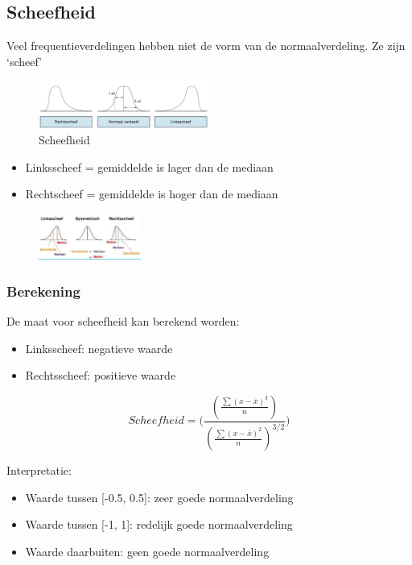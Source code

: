 \documentclass{article}
\begin{document}
\subsection{Scheefheid}

Veel frequentieverdelingen hebben niet de vorm van de normaalverdeling. Ze zijn `scheef'

\begin{figure}[H]
    \centering
    \includegraphics[width=0.5\textwidth]{scheefheid.png}
    \caption{Scheefheid}
\end{figure}

\begin{itemize}
    \item Linksscheef = gemiddelde is lager dan de mediaan
    \item Rechtscheef = gemiddelde is hoger dan de mediaan
\end{itemize}

\begin{figure}[H]
    \centering
    \includegraphics[width=0.3\textwidth]{scheefheid2.png}
\end{figure}

\subsubsection{Berekening}

De maat voor scheefheid kan berekend worden:

\begin{itemize}
    \item Linksscheef: negatieve waarde
    \item Rechtsscheef: positieve waarde
\end{itemize}

\begin{equation}
    Scheefheid = \Bigg(\frac{(\frac{\sum(x - \bar{x})^3}{n})}{(\frac{\sum(x - \bar{x})^2}{n})^{3/2}}\Bigg)
\end{equation}

Interpretatie:

\begin{itemize}
    \item Waarde tussen [-0.5, 0.5]: zeer goede normaalverdeling
    \item Waarde tussen [-1, 1]: redelijk goede normaalverdeling
    \item Waarde daarbuiten: geen goede normaalverdeling
\end{itemize}
\end{document}

